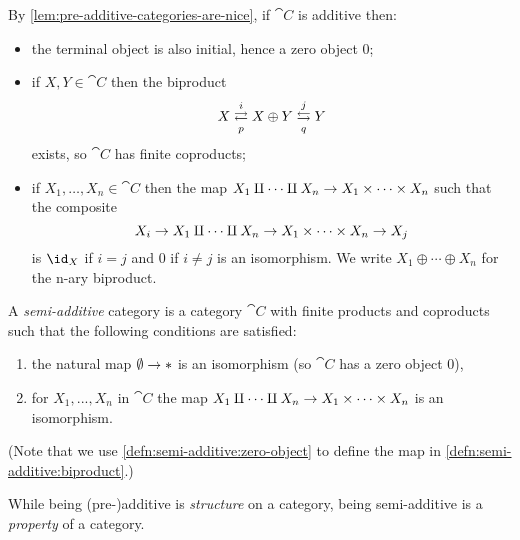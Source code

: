 \documentclass[../main.tex]{subfiles}
\begin{document}
\begin{rmk}
  By \cref{lem:pre-additive-categories-are-nice}, if $\cat C$ is additive then:
  \begin{itemize}
      \item the terminal object is also initial, hence a zero object $0$;
    \item if $X, Y \in \cat C$ then the biproduct \[X \xrightleftarrows{i}[p] X \oplus Y \xleftrightarrows{j}[q] Y\] exists, so $\cat C$ has finite coproducts;
    \item if $X_1, \ldots, X_n \in \cat C$ then the map $X_1 \amalg \cdots \amalg X_n \to X_1 \times \cdots \times X_n$ such that the composite
                  \[ X_i \to X_1 \amalg \cdots \amalg X_n \to X_1 \times \cdots \times X_n \to X_j \]
                is $\id_X$ if $i = j$ and $0$ if $i \neq j$ is an isomorphism. We write $X_1 \oplus \cdots \oplus X_n$ for the n-ary biproduct.
    \end{itemize}

\end{rmk}

\begin{defn}\label{defn:semi-additive}
A \emph{semi-additive} category is a category $\cat C$ with finite products and coproducts such that the following conditions are satisfied:
\begin{enumerate}
\item\label{defn:semi-additive:zero-object} the natural map $\emptyset \to {\mathord{*}}$ is an isomorphism (so $\cat C$ has a zero object $0$),
\item\label{defn:semi-additive:biproduct} for $X_1, ..., X_n$ in $\cat C$ the map $X_1 \amalg \cdots \amalg X_n \to X_1 \times \cdots \times X_n$ is an isomorphism.
\end{enumerate}
(Note that we use \cref{defn:semi-additive:zero-object} to define the map in \cref{defn:semi-additive:biproduct}.)
\end{defn}

\begin{rmk}
While being (pre-)additive is \emph{structure} on a category, being semi-additive is a \emph{property} of a category.
\end{rmk}
\end{document}

